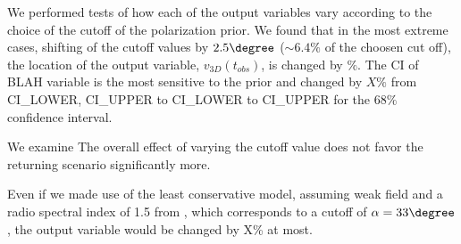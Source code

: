 \label{sec: sensitivityTests}
We performed tests of how each of the output variables vary according to the
choice of the cutoff of the polarization prior.
We found that in the most extreme cases, shifting of the cutoff values by
$2.5\degree$ ($\sim 6.4\%$ of the choosen cut off), the location of the output
variable, $v_{3D}(t_{obs})$, is changed by $\%$. The CI of BLAH variable is
the most sensitive to the prior and changed by $X\%$ from CI_LOWER, CI_UPPER to
CI_LOWER to CI_UPPER for the $68\%$ confidence interval. 

We examine The overall effect of varying the cutoff value does not favor the
returning scenario significantly more. 

Even if we made use of the least conservative model, assuming weak field
and a radio spectral index of 1.5 from \cite{E98}, which
corresponds to a cutoff of $\alpha = 33\degree$, the output variable would
be changed by X\% at most. 





